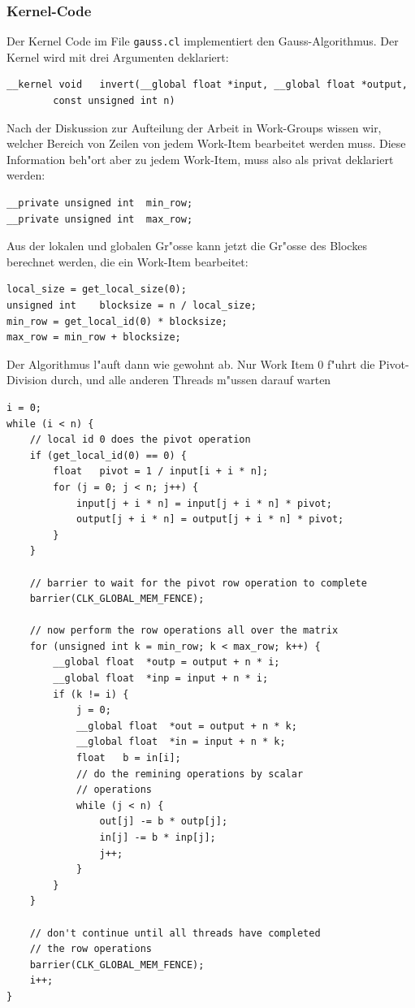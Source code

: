 \subsubsection{Kernel-Code}
Der Kernel Code im File \verb+gauss.cl+ implementiert den Gauss-Algorithmus.
Der Kernel wird mit drei Argumenten deklariert:
\begin{verbatim}
__kernel void   invert(__global float *input, __global float *output,
        const unsigned int n)
\end{verbatim}
Nach der Diskussion zur Aufteilung der Arbeit in Work-Groups wissen wir,
welcher Bereich von Zeilen von jedem Work-Item bearbeitet werden muss.
Diese Information beh"ort aber zu jedem Work-Item, muss also als 
privat deklariert werden:
\begin{verbatim}
__private unsigned int  min_row;
__private unsigned int  max_row;
\end{verbatim}
Aus der lokalen und globalen Gr"osse kann jetzt die Gr"osse des Blockes
berechnet werden, die ein Work-Item bearbeitet:
\begin{verbatim}
local_size = get_local_size(0);
unsigned int    blocksize = n / local_size;
min_row = get_local_id(0) * blocksize;
max_row = min_row + blocksize;
\end{verbatim}
Der Algorithmus l"auft dann wie gewohnt ab.
Nur Work Item 0 f"uhrt die Pivot-Division durch, und alle anderen
Threads m"ussen darauf warten
\begin{verbatim}
i = 0;
while (i < n) {
    // local id 0 does the pivot operation
    if (get_local_id(0) == 0) {
        float   pivot = 1 / input[i + i * n];
        for (j = 0; j < n; j++) {
            input[j + i * n] = input[j + i * n] * pivot;
            output[j + i * n] = output[j + i * n] * pivot;
        }
    }

    // barrier to wait for the pivot row operation to complete
    barrier(CLK_GLOBAL_MEM_FENCE);

    // now perform the row operations all over the matrix
    for (unsigned int k = min_row; k < max_row; k++) {
        __global float  *outp = output + n * i;
        __global float  *inp = input + n * i;
        if (k != i) {
            j = 0; 
            __global float  *out = output + n * k;
            __global float  *in = input + n * k;
            float   b = in[i];
            // do the remining operations by scalar
            // operations
            while (j < n) {
                out[j] -= b * outp[j];
                in[j] -= b * inp[j];
                j++;
            }
        }
    }

    // don't continue until all threads have completed
    // the row operations
    barrier(CLK_GLOBAL_MEM_FENCE);
    i++;
}
\end{verbatim}

